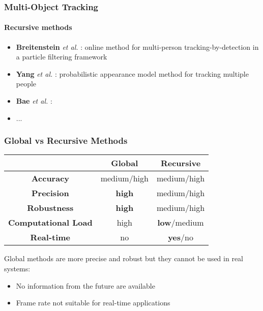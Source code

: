 \begin{frame}
	\frametitle{Multi-Object Tracking}
	\framesubtitle{Recursive methods}
	
	\Large
	
	\vspace{0.2cm}
	
	\begin{itemize}
		\item \textbf{Breitenstein} \emph{et al.} \cite{Breitenstein11}: online method for
			  multi-person tracking-by-detection in a particle filtering framework
		\vspace{0.1cm}
		\item \textbf{Yang} \emph{et al.} \cite{Yang09}: probabilistic appearance model
			  method for tracking multiple people
		\vspace{0.1cm}
		\item \textbf{Bae} \emph{et al.} \cite{Bae14}: 
		\vspace{0.1cm}
		\item ...
	\end{itemize}
\end{frame}

\begin{frame}
	\frametitle{Global vs Recursive Methods}
	
	\Large
	
	\begin{table}[!t]
		\centering
		\begin{tabular}{ c | c | c | }
			\cline{2-3}
			& \textbf{Global} & \textbf{Recursive} \\ \hline
			
			\multicolumn{1}{|c|}{\textbf{Accuracy}} & medium/high & medium/high \\ \hline
			\multicolumn{1}{|c|}{\textbf{Precision}} & \textbf{high} & medium/high \\ \hline
			\multicolumn{1}{|c|}{\textbf{Robustness}} & \textbf{high} & medium/high \\ \hline
			\multicolumn{1}{|c|}{\textbf{Computational Load}} & high & \textbf{low}/medium \\ \hline
			\multicolumn{1}{|c|}{\textbf{Real-time}} & no & \textbf{yes}/no \\ \hline
		\end{tabular}
	\end{table}
	
	Global methods are more precise and robust but they cannot be used in real systems:
	\begin{itemize}
		\item No information from the future are available
		\item Frame rate not suitable for real-time applications
	\end{itemize}
\end{frame}
